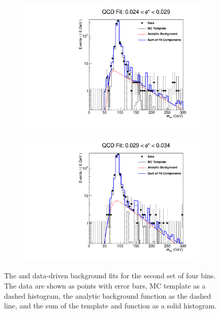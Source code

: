 \begin{figure}[!htbp]
\begin{subfigure}[b]{\SideBySidePlotWidth}
        \includegraphics[width=\linewidth]{figures/qcd_fits/qcd_fit_plot_for_07.pdf}
        \caption{}
        \label{fig:qcd_fit_07}
    \end{subfigure}%
    \begin{subfigure}[b]{\SideBySidePlotWidth}
        \includegraphics[width=\linewidth]{figures/qcd_fits/qcd_fit_plot_for_08.pdf}
        \caption{}
        \label{fig:qcd_fit_08}
    \end{subfigure}
    \caption[
       The \QCDjets and \wjets data-driven background fits for the second set
       of four \phistar bins.
    ]{
       The \QCDjets and \wjets data-driven background fits for the second set
       of four \phistar bins. The data are shown as points with error bars, MC
       template as a dashed histogram, the analytic background function as the
       dashed line, and the sum of the template and function as a solid
       histogram.
    }
    \label{fig:qcd_many_2}
\end{figure}


